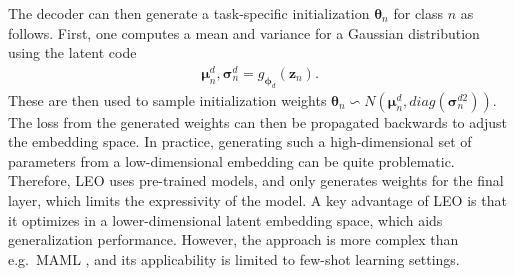 The decoder can then generate a task-specific initialization $\boldsymbol{\theta}_{n}$ for class $n$ as follows. First, one computes a mean and variance for a Gaussian distribution using the latent code
\begin{align}
    \boldsymbol{\mu}_{n}^{d}, \boldsymbol{\sigma}_{n}^{d} = g_{\boldsymbol{\phi}_{d}}(\boldsymbol{z}_{n}).
\end{align} These are then used to sample initialization weights $\boldsymbol{\theta}_{n} \backsim N(\boldsymbol{\mu}^{d}_{n}, diag(\boldsymbol{\sigma}^{d2}_{n}))$. The loss from the generated weights can then be propagated backwards to adjust the embedding space. In practice, generating such a high-dimensional set of parameters from a low-dimensional embedding can be quite problematic. Therefore, LEO uses pre-trained models, and only generates weights for the final layer, which limits the expressivity of the model.   
A key advantage of LEO is that it optimizes in a lower-dimensional latent embedding space, which aids generalization performance. However, the approach is more complex than e.g.\ MAML , and its applicability is limited to few-shot learning settings.

